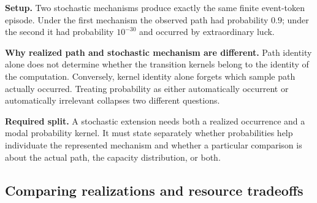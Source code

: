 \documentclass[11pt,a4paper]{article}
\newcounter{thought}
\newenvironment{thoughtbox}[1]{%
  \refstepcounter{thought}%
  \begin{tcolorbox}[
    enhanced,breakable,
    colback=white,colframe=navy,boxrule=0.85pt,
    arc=1.7mm,left=2.8mm,right=2.8mm,top=2.2mm,bottom=2.0mm,
    borderline west={2.2pt}{0pt}{blue},
    title={\large\bfseries Thought experiment \thethought: #1},
    fonttitle=\bfseries,coltitle=navy,
    attach boxed title to top left={xshift=2mm,yshift=-2mm},
    boxed title style={colback=sky,colframe=blue,boxrule=0.55pt,arc=1.2mm},
    before skip=9pt,after skip=10pt
  ]
}{\end{tcolorbox}}
\newcommand{\scene}{\medskip\textbf{Setup.} }
\begin{document}
\begin{thoughtbox}{Same path, different probabilities}
\scene Two stochastic mechanisms produce exactly the same finite event-token episode. Under the first mechanism the observed path had probability $0.9$; under the second it had probability $10^{-30}$ and occurred by extraordinary luck.

\medskip\textbf{Why realized path and stochastic mechanism are different.} Path identity alone does not determine whether the transition kernels belong to the identity of the computation. Conversely, kernel identity alone forgets which sample path actually occurred. Treating probability as either automatically occurrent or automatically irrelevant collapses two different questions.

\medskip\textbf{Required split.} A stochastic extension needs both a realized occurrence and a modal probability kernel. It must state separately whether probabilities help individuate the represented mechanism and whether a particular comparison is about the actual path, the capacity distribution, or both.
\end{thoughtbox}

\subsection{Comparing realizations and resource tradeoffs}
\end{document}
